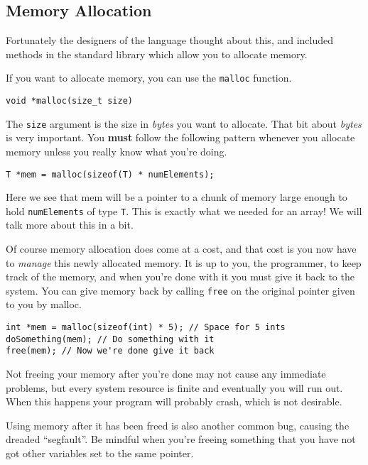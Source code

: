 \subsection{Memory Allocation}

Fortunately the designers of the language thought about this, and included methods in the standard library which allow you to allocate memory.

If you want to allocate memory, you can use the \texttt{malloc} function. 

\begin{lstlisting}[numbers=none,frame=none]
void *malloc(size_t size)
\end{lstlisting}

The \texttt{size} argument is the size in \emph{bytes} you want to allocate.
That bit about \emph{bytes} is very important.
You \textbf{must} follow the following pattern whenever you allocate memory unless you really know what you're doing.

\begin{lstlisting}[numbers=none,frame=none]
T *mem = malloc(sizeof(T) * numElements);
\end{lstlisting}

Here we see that mem will be a pointer to a chunk of memory large enough to hold \texttt{numElements} of type \texttt{T}.
This is exactly what we needed for an array!
We will talk more about this in a bit.

Of course memory allocation does come at a cost, and that cost is you now have to \emph{manage} this newly allocated memory.
It is up to you, the programmer, to keep track of the memory, and when you're done with it you must give it back to the system.
You can give memory back by calling \texttt{free} on the original pointer given to you by malloc.

\begin{lstlisting}
int *mem = malloc(sizeof(int) * 5); // Space for 5 ints
doSomething(mem); // Do something with it
free(mem); // Now we're done give it back
\end{lstlisting}

Not freeing your memory after you're done may not cause any immediate problems, but every system resource is finite and eventually you will run out.
When this happens your program will probably crash, which is not desirable.

Using memory after it has been freed is also another common bug, causing the dreaded ``segfault''.
Be mindful when you're freeing something that you have not got other variables set to the same pointer.

